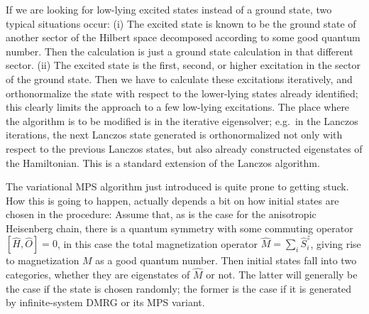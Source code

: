 \documentclass[a4paper,10pt,oneside,onecolumn,1p,times]{elsarticle}
\begin{document}
If we are looking for low-lying excited states instead of a ground state, two typical situations occur: 
(i) The excited state is known to be the ground state of another sector of the Hilbert space decomposed according to some good quantum number. Then the calculation is just a ground state calculation in that different sector. (ii) The excited state is the first, second, or higher excitation in the sector of the ground state. Then we have to calculate these excitations iteratively, and orthonormalize the state with respect to the lower-lying states already identified; this clearly limits the approach to a few low-lying excitations. The place where the algorithm is to be modified is in the iterative eigensolver; e.g.\ in the Lanczos iterations, the next Lanczos state generated is orthonormalized not only with respect to the previous Lanczos states, but also already constructed eigenstates of the Hamiltonian. This is a standard extension of the Lanczos algorithm.
 
The variational MPS algorithm just introduced is quite prone to getting stuck. How this is going to happen, actually depends a bit on how initial states are chosen in the procedure: Assume that, as is the case for the anisotropic Heisenberg chain, there is a quantum symmetry with some commuting operator $[\hat{H},\hat{O}]=0$, in this case the total magnetization operator $\hat{M}=\sum_i \hat{S}^z_i$, giving rise to magnetization $M$ as a good quantum number. Then initial states fall into two categories, whether they are eigenstates of $\hat{M}$ or not. The latter will generally be the case if the state is chosen randomly; the former is the case if it is generated by infinite-system DMRG or its MPS variant. 
\end{document}

